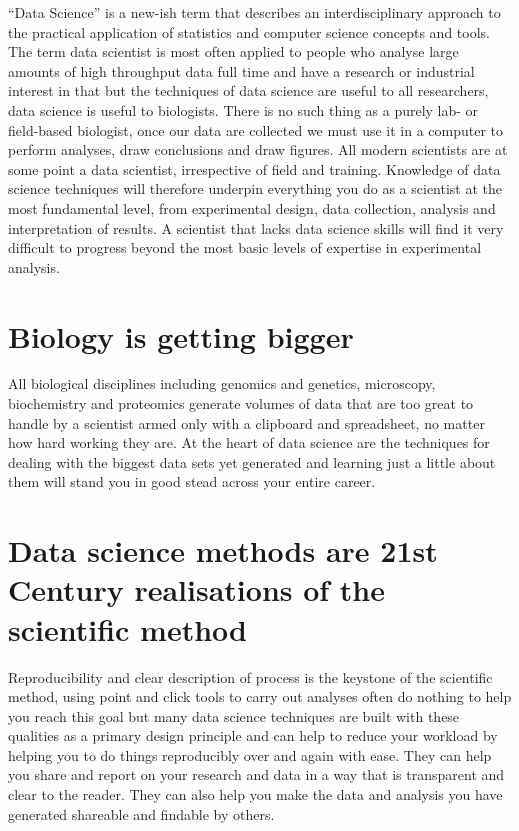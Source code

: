 \documentclass[
]{book}
\begin{document}
``Data Science'' is a new-ish term that describes an interdisciplinary approach to the practical application of statistics and computer science concepts and tools. The term data scientist is most often applied to people who analyse large amounts of high throughput data full time and have a research or industrial interest in that but the techniques of data science are useful to all researchers, data science is useful to biologists. There is no such thing as a purely lab- or field-based biologist, once our data are collected we must use it in a computer to perform analyses, draw conclusions and draw figures. All modern scientists are at some point a data scientist, irrespective of field and training. Knowledge of data science techniques will therefore underpin everything you do as a scientist at the most fundamental level, from experimental design, data collection, analysis and interpretation of results. A scientist that lacks data science skills will find it very difficult to progress beyond the most basic levels of expertise in experimental analysis.

\hypertarget{biology-is-getting-bigger}{%
\section{Biology is getting bigger}\label{biology-is-getting-bigger}}

All biological disciplines including genomics and genetics, microscopy, biochemistry and proteomics generate volumes of data that are too great to handle by a scientist armed only with a clipboard and spreadsheet, no matter how hard working they are. At the heart of data science are the techniques for dealing with the biggest data sets yet generated and learning just a little about them will stand you in good stead across your entire career.

\hypertarget{data-science-methods-are-21st-century-realisations-of-the-scientific-method}{%
\section{Data science methods are 21st Century realisations of the scientific method}\label{data-science-methods-are-21st-century-realisations-of-the-scientific-method}}

Reproducibility and clear description of process is the keystone of the scientific method, using point and click tools to carry out analyses often do nothing to help you reach this goal but many data science techniques are built with these qualities as a primary design principle and can help to reduce your workload by helping you to do things reproducibly over and again with ease. They can help you share and report on your research and data in a way that is transparent and clear to the reader. They can also help you make the data and analysis you have generated shareable and findable by others.
\end{document}
